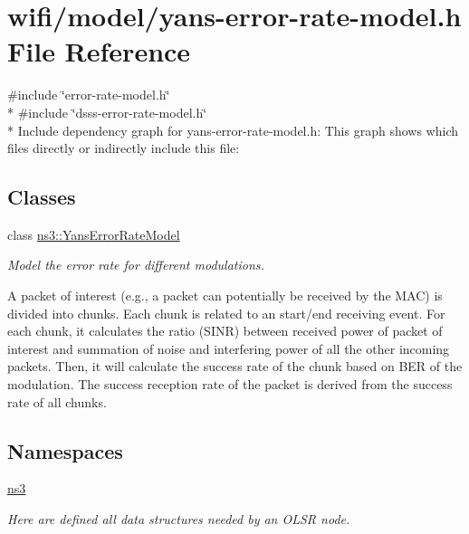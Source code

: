 \hypertarget{yans-error-rate-model_8h}{}\section{wifi/model/yans-\/error-\/rate-\/model.h File Reference}
\label{yans-error-rate-model_8h}
{\ttfamily \#include \char`\"{}error-\/rate-\/model.\+h\char`\"{}}\\*
{\ttfamily \#include \char`\"{}dsss-\/error-\/rate-\/model.\+h\char`\"{}}\\*
Include dependency graph for yans-\/error-\/rate-\/model.h\+:
This graph shows which files directly or indirectly include this file\+:
\subsection*{Classes}
\begin{DoxyCompactItemize}
\item 
class \hyperlink{classns3_1_1YansErrorRateModel}{ns3\+::\+Yans\+Error\+Rate\+Model}
\begin{DoxyCompactList}\small\item\em Model the error rate for different modulations.

A packet of interest (e.\+g., a packet can potentially be received by the M\+AC) is divided into chunks. Each chunk is related to an start/end receiving event. For each chunk, it calculates the ratio (S\+I\+NR) between received power of packet of interest and summation of noise and interfering power of all the other incoming packets. Then, it will calculate the success rate of the chunk based on B\+ER of the modulation. The success reception rate of the packet is derived from the success rate of all chunks. \end{DoxyCompactList}\end{DoxyCompactItemize}
\subsection*{Namespaces}
\begin{DoxyCompactItemize}
\item 
 \hyperlink{namespacens3}{ns3}
\begin{DoxyCompactList}\small\item\em Here are defined all data structures needed by an O\+L\+SR node. \end{DoxyCompactList}\end{DoxyCompactItemize}
